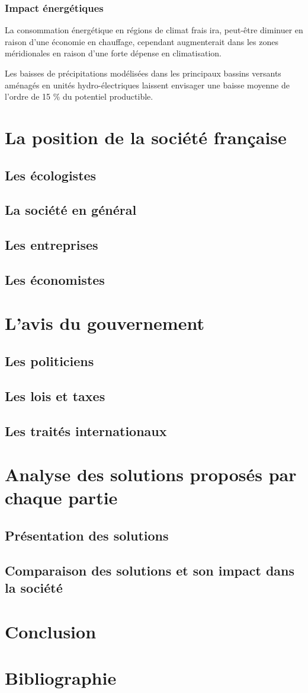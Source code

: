 \documentclass[a4paper,11pt]{article}
\begin{document}
\subsubsection*{Impact énergétiques}
La consommation énergétique  en régions de climat frais  ira, peut-être diminuer
en raison  d'une économie  en chauffage, cependant  augmenterait dans  les zones
méridionales en raison d'une forte dépense en climatisation.

Les baisses de précipitations modélisées dans les principaux bassins versants
aménagés en unités hydro-électriques laissent envisager une baisse moyenne de
l’ordre de 15 \% du potentiel productible.


\section{La position de la société française}
\subsection{Les écologistes}
\subsection{La société en général} 
\subsection{Les entreprises}
\subsection{Les économistes} 


\section{L’avis du gouvernement}
\subsection{Les politiciens}
\subsection{Les lois et taxes}
\subsection{Les traités internationaux}


\section{Analyse des solutions proposés par chaque partie}
\subsection{Présentation des solutions}
\subsection{Comparaison des solutions et son impact dans la société}


\section*{Conclusion}
\section*{Bibliographie}
\end{document}
